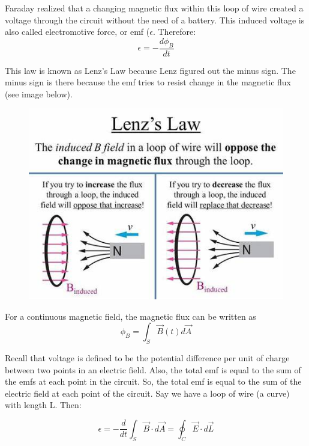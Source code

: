 \documentclass{article}
\begin{document}
\vspace{1em}

Faraday realized that a changing magnetic flux within this loop of wire created a voltage through the circuit without the need of a battery. This induced voltage is also called electromotive force, or emf ($\epsilon$. Therefore:
\begin{equation}
\epsilon = -\frac{d\phi_B}{dt}
\end{equation}

\vspace{1em}
This law is known as Lenz's Law because Lenz figured out the minus sign. The minus sign is there because the emf tries to resist change in the magnetic flux (see image below).

\vspace{3em}
\begin{figure}[h]
    \centering
    \includegraphics[width=0.7\linewidth]{LenzDiagram.png}
\end{figure}
\vspace{3em}

\vspace{1em}
For a continuous magnetic field, the magnetic flux can be written as 
\begin{equation}
\phi_B = \int_S \vec B(t) d\vec A
\end{equation} 

\vspace{1em}
Recall that voltage is defined to be the potential difference per unit of charge between two points in an electric field. Also, the total emf is equal to the sum of the emfs at each point in the circuit. So, the total emf is equal to the sum of the electric field at each point of the circuit. Say we have a loop of wire (a curve) with length L. Then:

\begin{equation}
\boxed{\epsilon = -\frac{d}{dt}\int_S \vec B \cdot d \vec A = \oint_C \vec E \cdot d \vec L}
\end{equation}
\end{document}
